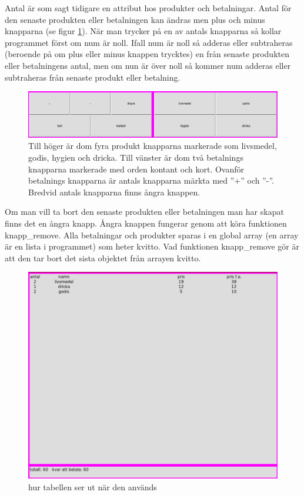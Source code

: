 \documentclass[a4paper, 12pt]{article}
\begin{document}
Antal är som sagt tidigare en attribut hos produkter och betalningar. Antal för den senaste produkten eller betalningen kan ändras men plus och minus knapparna (se figur \ref{fig:3alt}).
När man trycker på en av antals knapparna så kollar programmet först om num är noll. Ifall num är noll så adderas eller subtraheras (beroende på om plus eller minus knappen trycktes) en från senaste produkten eller betalningens antal, men om nun är över noll så kommer num adderas eller subtraheras från senaste produkt eller betalning. 


\begin{figure}[h!]
  \includegraphics[width=\linewidth]{img/3alt.png}
  \caption{
	  Till höger är dom fyra produkt knapparna markerade som livsmedel, godis, hygien och dricka.
	  Till vänster är dom två betalnings knapparna markerade med orden kontant och kort.
	  Ovanför betalnings knapparna är antals knapparna märkta med ''+'' och ''-''.
	  Bredvid antals knapparna finns ångra knappen. 
	}
  \label{fig:3alt}
\end{figure}


Om man vill ta bort den senaste produkten eller betalningen man har skapat finns det en ångra knapp.
Ångra knappen fungerar genom att köra funktionen knapp\_remove. 
Alla betalningar och produkter sparas i en global array (en array är en lista i programmet) som heter kvitto. Vad funktionen knapp\_remove gör är att den tar bort det sista objektet från arrayen kvitto.

\begin{figure}[t!]
\centering
  \includegraphics[width=0.7\linewidth]{img/kvitto_disp.png}
  \caption{ hur tabellen ser ut när den används}
  \label{fig:kdisp}
\end{figure}
\end{document}
